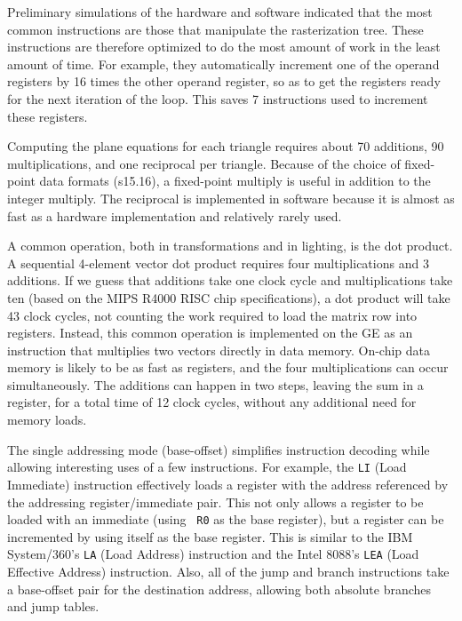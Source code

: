 \documentclass{book}
\begin{document}

Preliminary simulations of the hardware and software indicated that the
most common instructions are those that manipulate the rasterization
tree.  These instructions are therefore optimized to do the most
amount of work in the least amount of time.  For example, they
automatically increment one of the operand registers by 16 times the
other operand register, so as to get the registers ready for the next
iteration of the loop.  This saves 7 instructions used to increment
these registers.

Computing the plane equations for each triangle requires about 70
additions, 90 multiplications, and one reciprocal per triangle. Because
of the choice of fixed-point data formats (s15.16), a fixed-point
multiply is useful in addition to the integer multiply.  The reciprocal
is implemented in software because it is almost as fast as a hardware
implementation and relatively rarely used.

A common operation, both in transformations and in lighting, is the dot
product.  A sequential 4-element vector dot product requires four
multiplications and 3 additions.  If we guess that additions take one
clock cycle and multiplications take ten (based on the MIPS R4000 RISC
chip specifications\cite{mips}), a dot product will take 43 clock
cycles, not counting the work required to load the matrix row into
registers.  Instead, this common operation is implemented on the GE as an
instruction that multiplies two vectors directly in data memory.
On-chip data memory is likely to be as fast as registers, and the four
multiplications can occur simultaneously.  The additions can happen in
two steps, leaving the sum in a register, for a total time of 12 clock
cycles, without any additional need for memory loads.

The single addressing mode (base-offset) simplifies instruction decoding
while allowing interesting uses of a few instructions.  For example, the
{\tt LI} (Load Immediate) instruction effectively loads a register with
the address referenced by the addressing register/immediate pair.  This
not only allows a register to be loaded with an immediate (using {\tt
R0} as the base register), but a register can be incremented by using
itself as the base register.  This is similar to the IBM System/360's
{\tt LA} (Load Address) instruction and the Intel 8088's {\tt LEA} (Load
Effective Address) instruction.  Also, all of the jump and branch
instructions take a base-offset pair for the destination address,
allowing both absolute branches and jump tables.
\end{document}
